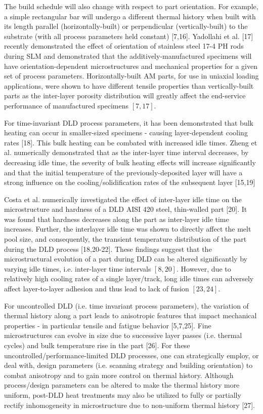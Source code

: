 \documentclass[10pt]{article}
\begin{document}
The build schedule will also change with respect to part orientation. For example, a simple rectangular bar will undergo a different thermal history when built with its length parallel (horizontally-built) or perpendicular (vertically-built) to the substrate (with all process parameters held constant) [7,16]. Yadollahi et al. [17] recently demonstrated the effect of orientation of stainless steel 17-4 PH rods during SLM and demonstrated that the additively-manufactured specimens will have orientation-dependent microstructures and mechanical properties for a given set of process parameters. Horizontally-built AM parts, for use in uniaxial loading applications, were shown to have different tensile properties than vertically-built parts as the inter-layer porosity distribution will greatly affect the end-service performance of manufactured specimens $[7,17]$.

For time-invariant DLD process parameters, it has been demonstrated that bulk heating can occur in smaller-sized specimens - causing layer-dependent cooling rates [18]. This bulk heating can be combated with increased idle times. Zheng et al. numerically demonstrated that as the inter-layer time interval decreases, by decreasing idle time, the severity of bulk heating effects will increase significantly and that the initial temperature of the previously-deposited layer will have a strong influence on the cooling/solidification rates of the subsequent layer [15,19]

Costa et al. numerically investigated the effect of inter-layer idle time on the microstructure and hardness of a DLD AISI 420 steel, thin-walled part [20]. It was found that hardness decreases along the part as inter-layer idle time increases. Further, the interlayer idle time was shown to directly affect the melt pool size, and consequently, the transient temperature distribution of the part during the DLD process [18,20-22]. These findings suggest that the microstructural evolution of a part during DLD can be altered significantly by varying idle times, i.e. inter-layer time intervals $[8,20]$. However, due to relatively high cooling rates of a single layer/track, long idle times can adversely affect layer-to-layer adhesion and thus lead to lack of fusion $[23,24]$.

For uncontrolled DLD (i.e. time invariant process parameters), the variation of thermal history along a part leads to anisotropic features that impact mechanical properties - in particular tensile and fatigue behavior [5,7,25]. Fine microstructures can evolve in size due to successive layer passes (i.e. thermal cycles) and bulk temperature rise in the part [26]. For these uncontrolled/performance-limited DLD processes, one can strategically employ, or deal with, design parameters (i.e. scanning strategy and building orientation) to combat anisotropy and to gain more control on thermal history. Although process/design parameters can be altered to make the thermal history more uniform, post-DLD heat treatments may also be utilized to fully or partially rectify inhomogeneity in microstructure due to non-uniform thermal history [27].
\end{document}
